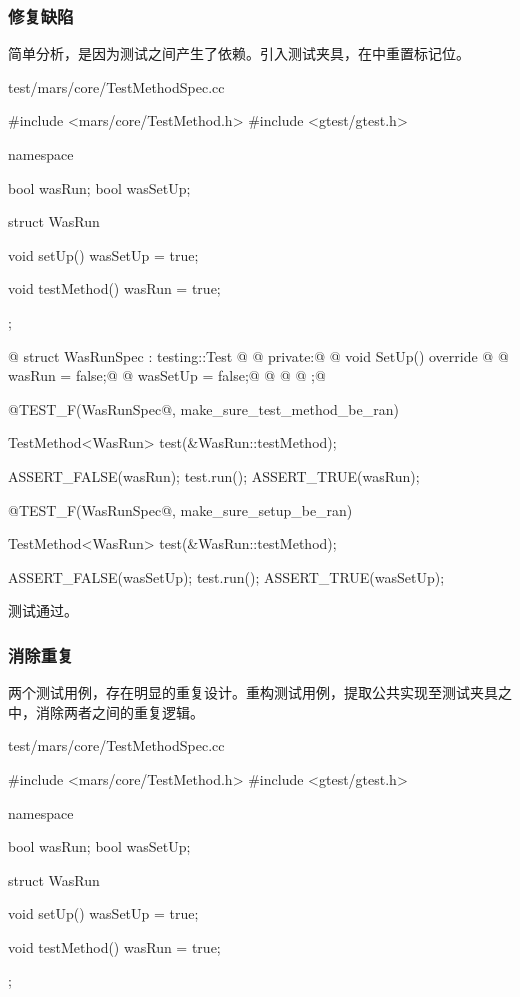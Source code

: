\begin{content}
\subsubsection{修复缺陷}

简单分析，是因为测试之间产生了依赖。引入测试夹具，在中重置标记位。

\begin{nodiff}{test/mars/core/TestMethodSpec.cc}
\begin{c++}
#include <mars/core/TestMethod.h>
#include <gtest/gtest.h>

namespace {
  bool wasRun;
  bool wasSetUp;

  struct WasRun {
    void setUp() {
      wasSetUp = true;
    }

    void testMethod() {
      wasRun = true;
    }
  };

@  struct WasRunSpec : testing::Test {@
@  private:@
@    void SetUp() override {@
@      wasRun = false;@
@      wasSetUp = false;@
@    }@
@  };@
}

@TEST_F(WasRunSpec@, make_sure_test_method_be_ran) {
  TestMethod<WasRun> test(&WasRun::testMethod);

  ASSERT_FALSE(wasRun);
  test.run();
  ASSERT_TRUE(wasRun);
}

@TEST_F(WasRunSpec@, make_sure_setup_be_ran) {
  TestMethod<WasRun> test(&WasRun::testMethod);

  ASSERT_FALSE(wasSetUp);
  test.run();
  ASSERT_TRUE(wasSetUp);
}
\end{c++}
\end{nodiff}

测试通过。

\subsubsection{消除重复}

两个测试用例，存在明显的重复设计。重构测试用例，提取公共实现至测试夹具之中，消除两者之间的重复逻辑。

\begin{nodiff}{test/mars/core/TestMethodSpec.cc}
\begin{c++}
#include <mars/core/TestMethod.h>
#include <gtest/gtest.h>

namespace {
  bool wasRun;
  bool wasSetUp;

  struct WasRun {
    void setUp() {
      wasSetUp = true;
    }

    void testMethod() {
      wasRun = true;
    }
  };

}
\end{c++}
\end{nodiff}
\end{content}
